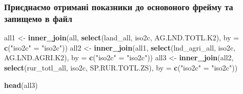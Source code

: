\documentclass[
]{article}
\newenvironment{Shaded}{\begin{snugshade}}{\end{snugshade}}
\newcommand{\DataTypeTok}[1]{\textcolor[rgb]{0.13,0.29,0.53}{#1}}
\newcommand{\KeywordTok}[1]{\textcolor[rgb]{0.13,0.29,0.53}{\textbf{#1}}}
\newcommand{\NormalTok}[1]{#1}
\newcommand{\StringTok}[1]{\textcolor[rgb]{0.31,0.60,0.02}{#1}}
\begin{document}
\hypertarget{ux43fux440ux438ux454ux434ux43dux430ux454ux43cux43e-ux43eux442ux440ux438ux43cux430ux43dux456-ux43fux43eux43aux430ux437ux43dux438ux43aux438-ux434ux43e-ux43eux441ux43dux43eux432ux43eux43dux43eux433ux43e-ux444ux440ux435ux439ux43cux443-ux442ux430-ux437ux430ux43fux438ux449ux435ux43cux43e-ux432-ux444ux430ux439ux43b}{%
\subsubsection{Приєднаємо отримані показники до основоного фрейму та
запищемо в
файл}\label{ux43fux440ux438ux454ux434ux43dux430ux454ux43cux43e-ux43eux442ux440ux438ux43cux430ux43dux456-ux43fux43eux43aux430ux437ux43dux438ux43aux438-ux434ux43e-ux43eux441ux43dux43eux432ux43eux43dux43eux433ux43e-ux444ux440ux435ux439ux43cux443-ux442ux430-ux437ux430ux43fux438ux449ux435ux43cux43e-ux432-ux444ux430ux439ux43b}}

\begin{Shaded}
\begin{Highlighting}[]
\NormalTok{all1 <-}\StringTok{ }\KeywordTok{inner_join}\NormalTok{(all, }\KeywordTok{select}\NormalTok{(land_all, iso2c, AG.LND.TOTL.K2), }\DataTypeTok{by =} \KeywordTok{c}\NormalTok{(}\StringTok{"iso2c"}\NormalTok{ =}\StringTok{ "iso2c"}\NormalTok{))}
\NormalTok{all2 <-}\StringTok{ }\KeywordTok{inner_join}\NormalTok{(all1, }\KeywordTok{select}\NormalTok{(lnd_agri_all, iso2c, AG.LND.AGRI.K2), }\DataTypeTok{by =} \KeywordTok{c}\NormalTok{(}\StringTok{"iso2c"}\NormalTok{ =}\StringTok{ "iso2c"}\NormalTok{))}
\NormalTok{all3 <-}\StringTok{ }\KeywordTok{inner_join}\NormalTok{(all2, }\KeywordTok{select}\NormalTok{(rur_totl_all, iso2c, SP.RUR.TOTL.ZS), }\DataTypeTok{by =} \KeywordTok{c}\NormalTok{(}\StringTok{"iso2c"}\NormalTok{ =}\StringTok{ "iso2c"}\NormalTok{))}

\KeywordTok{head}\NormalTok{(all3)}
\end{Highlighting}
\end{Shaded}
\end{document}
